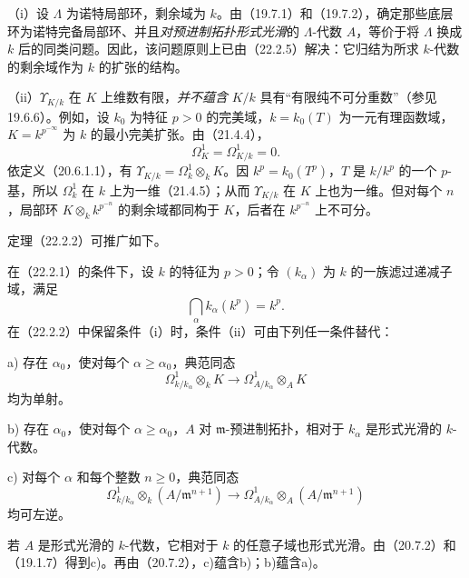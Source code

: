 （i）设 $\Lambda$ 为诺特局部环，剩余域为 $k$。由（19.7.1）和（19.7.2），确定那些底层环为诺特完备局部环、并且\emph{对预进制拓扑形式光滑}的 $\Lambda$-代数 $A$，等价于将 $\Lambda$ 换成 $k$ 后的同类问题。因此，该问题原则上已由（22.2.5）解决：它归结为所求 $k$-代数的剩余域作为 $k$ 的扩张的结构。

（ii）$\Upsilon_{K/k}$ 在 $K$ 上维数有限，\emph{并不蕴含} $K/k$ 具有“有限纯不可分重数”（参见19.6.6）。例如，设 $k_0$ 为特征 $p>0$ 的完美域，$k=k_0(T)$ 为一元有理函数域，$K=k^{p^{-\infty}}$ 为 $k$ 的最小完美扩张。由（21.4.4），
\[
 \Omega^1_K=\Omega^1_{K/k}=0.
\]
依定义（20.6.1.1），有 $\Upsilon_{K/k}=\Omega^1_k\otimes_k K$。因 $k^p=k_0(T^p)$，$T$ 是 $k/k^p$ 的一个 $p$-基，所以 $\Omega^1_k$ 在 $k$ 上为一维（21.4.5）；从而 $\Upsilon_{K/k}$ 在 $K$ 上也为一维。但对每个 $n$，局部环 $K\otimes_k k^{p^{-n}}$ 的剩余域都同构于 $K$，后者在 $k^{p^{-n}}$ 上不可分。

定理（22.2.2）可推广如下。

在（22.2.1）的条件下，设 $k$ 的特征为 $p>0$；令 $(k_\alpha)$ 为 $k$ 的一族滤过递减子域，满足
\[
 \bigcap_\alpha k_\alpha(k^p)=k^p.
\]
在（22.2.2）中保留条件（i）时，条件（ii）可由下列任一条件替代：

\noindent a) 存在 $\alpha_0$，使对每个 $\alpha\ge\alpha_0$，典范同态
\[
 \Omega^1_{k/k_\alpha}\otimes_k K
 \longrightarrow\Omega^1_{A/k_\alpha}\otimes_A K
\]
均为单射。

\noindent b) 存在 $\alpha_0$，使对每个 $\alpha\ge\alpha_0$，$A$ 对 $\mathfrak m$-预进制拓扑，相对于 $k_\alpha$ 是形式光滑的 $k$-代数。

\noindent c) 对每个 $\alpha$ 和每个整数 $n\ge0$，典范同态
\[
 \Omega^1_{k/k_\alpha}\otimes_k(A/\mathfrak m^{n+1})
 \longrightarrow
 \Omega^1_{A/k_\alpha}\otimes_A(A/\mathfrak m^{n+1})
\]
均可左逆。

\eproof
若 $A$ 是形式光滑的 $k$-代数，它相对于 $k$ 的任意子域也形式光滑。由（20.7.2）和（19.1.7）得到c)。再由（20.7.2），c)蕴含b)；b)蕴含a)。

